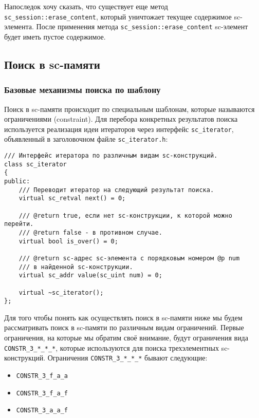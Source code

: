 Напоследок хочу сказать, что существует еще метод
\lstinline|sc_session::erase_content|, который уничтожает текущее
содержимое sc-элемента. После применения метода
\lstinline|sc_session::erase_content| sc-элемент будет иметь пустое
содержимое.

\subsection{Поиск в sc-памяти}
\label{sec:libsc_search}

\subsubsection{Базовые механизмы поиска по шаблону}
\label{sec:libsc_search_basic}

Поиск в sc-памяти происходит по специальным шаблонам, которые
называются ограничениями (constraint). Для перебора конкретных
результатов поиска используется реализация идеи итераторов через
интерфейс \lstinline|sc_iterator|, объявленный в заголовочном файле
\verb|sc_iterator.h|:
\begin{lstlisting}[texcl]
/// Интерфейс итератора по различным видам sc-конструкций.
class sc_iterator
{
public:
    /// Переводит итератор на следующий результат поиска.
    virtual sc_retval next() = 0;

    /// @return true, если нет sc-конструкции, к которой можно перейти.
    /// @return false - в противном случае.
    virtual bool is_over() = 0;

    /// @return sc-адрес sc-элемента с порядковым номером @p num
    /// в найденной sc-конструкции.
    virtual sc_addr value(sc_uint num) = 0;

    virtual ~sc_iterator();
};
\end{lstlisting}

Для того чтобы понять как осуществлять поиск в sc-памяти ниже мы будем
рассматривать поиск в sc-памяти по различным видам ограничений. Первые
ограничения, на которые мы обратим своё внимание, будут ограничения
вида \lstinline|CONSTR_3_*_*_*|, которые используются для поиска трехэлементных
sc-конструкций. Ограничения \lstinline|CONSTR_3_*_*_*| бывают следующие:
\begin{itemize}
\item \lstinline|CONSTR_3_f_a_a|
\item \lstinline|CONSTR_3_f_a_f|
\item \lstinline|CONSTR_3_a_a_f|
\end{itemize}

